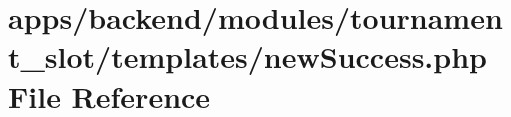 \hypertarget{backend_2modules_2tournament__slot_2templates_2new_success_8php}{\section{apps/backend/modules/tournament\-\_\-slot/templates/new\-Success.php File Reference}
\label{backend_2modules_2tournament__slot_2templates_2new_success_8php}
}
